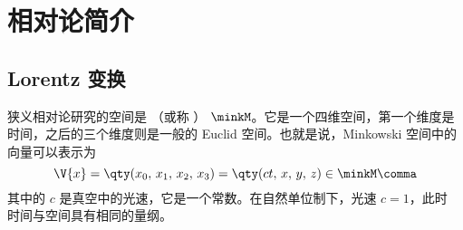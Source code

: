 %
%
%
%
%


\chapter{相对论简介}
\section{Lorentz 变换}
狭义相对论研究的空间是 （或称 ）
$\minkM$。它是一个四维空间，第一个维度是时间，之后的三个维度则是一般的 Euclid
空间。也就是说，Minkowski 空间中的向量可以表示为
\begin{equation}
  \V{x} = \qty(x_0,\,x_1,\,x_2,\,x_3) = \qty(ct,\,x,\,y,\,z)\in\minkM \comma
\end{equation}
其中的 $c$ 是真空中的光速，它是一个常数。在自然单位制下，光速 $c=1$，此时
时间与空间具有相同的量纲。

